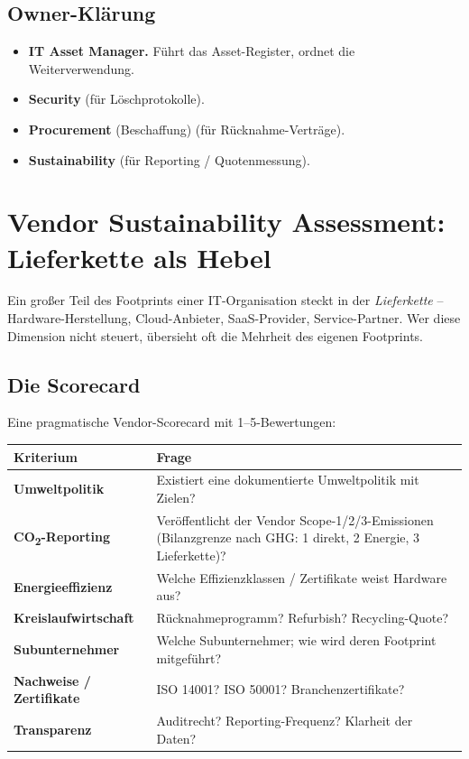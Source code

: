 \documentclass[11pt,a4paper,oneside]{article}
\newcommand{\fachbegriff}[1]{\textbf{#1}}
\begin{document}
\subsection{Owner-Klärung}

\begin{itemize}
  \item \fachbegriff{IT Asset Manager.} Führt das Asset-Register, ordnet die Weiterverwendung.
  \item \fachbegriff{Security} (für Löschprotokolle).
  \item \fachbegriff{Procurement} (Beschaffung) (für Rücknahme-Verträge).
  \item \fachbegriff{Sustainability} (für Reporting / Quotenmessung).
\end{itemize}

\section{Vendor Sustainability Assessment: Lieferkette als Hebel}

Ein großer Teil des Footprints einer IT-Organisation steckt in der \emph{Lieferkette} -- Hardware-Herstellung, Cloud-Anbieter, SaaS-Provider, Service-Partner. Wer diese Dimension nicht steuert, übersieht oft die Mehrheit des eigenen Footprints.

\subsection{Die Scorecard}

Eine pragmatische Vendor-Scorecard mit 1--5-Bewertungen:

\begin{tabularx}{\linewidth}{@{}>{\bfseries}lX@{}}
\toprule
Kriterium & Frage \\
\midrule
Umweltpolitik & Existiert eine dokumentierte Umweltpolitik mit Zielen? \\
CO\textsubscript{2}-Reporting & Veröffentlicht der Vendor Scope-1/2/3-Emissionen (Bilanzgrenze nach GHG: 1 direkt, 2 Energie, 3 Lieferkette)? \\
Energieeffizienz & Welche Effizienzklassen / Zertifikate weist Hardware aus? \\
Kreislaufwirtschaft & Rücknahmeprogramm? Refurbish? Recycling-Quote? \\
Subunternehmer & Welche Subunternehmer; wie wird deren Footprint mitgeführt? \\
Nachweise / Zertifikate & ISO 14001? ISO 50001? Branchenzertifikate? \\
Transparenz & Auditrecht? Reporting-Frequenz? Klarheit der Daten? \\
\bottomrule
\end{tabularx}
\end{document}

